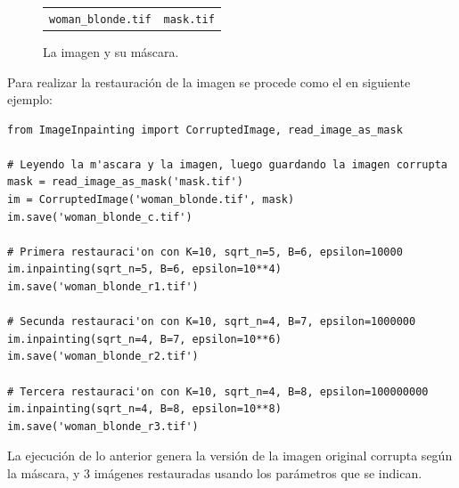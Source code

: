\begin{figure}[H]
\begin{tabular}{cc}
		\tiny\texttt{woman\_blonde.tif}&\tiny\texttt{mask.tif}\\
	\end{tabular}
	
	\caption{La imagen y su m\'ascara.}
	\label{fig:woman_blonde}
\end{figure}
Para realizar la restauraci\'on de la imagen se procede como el en siguiente ejemplo:
\begin{lstlisting}
from ImageInpainting import CorruptedImage, read_image_as_mask

# Leyendo la m'ascara y la imagen, luego guardando la imagen corrupta
mask = read_image_as_mask('mask.tif')
im = CorruptedImage('woman_blonde.tif', mask)
im.save('woman_blonde_c.tif')

# Primera restauraci'on con K=10, sqrt_n=5, B=6, epsilon=10000 
im.inpainting(sqrt_n=5, B=6, epsilon=10**4)
im.save('woman_blonde_r1.tif')

# Secunda restauraci'on con K=10, sqrt_n=4, B=7, epsilon=1000000
im.inpainting(sqrt_n=4, B=7, epsilon=10**6)
im.save('woman_blonde_r2.tif')

# Tercera restauraci'on con K=10, sqrt_n=4, B=8, epsilon=100000000 
im.inpainting(sqrt_n=4, B=8, epsilon=10**8)
im.save('woman_blonde_r3.tif')
\end{lstlisting}
La ejecuci\'on de lo anterior genera la versi\'on de la imagen original corrupta seg\'un la m\'ascara, y 3 im\'agenes restauradas usando los par\'ametros que se indican.
